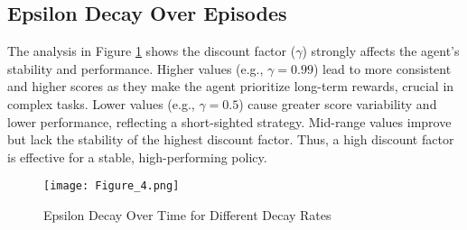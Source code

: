 \documentclass[conference]{IEEEtran}
\begin{document}
\subsection{Epsilon Decay Over Episodes}
The analysis in Figure \ref{fig:epsilon_decay_over_time} shows the discount factor ($\gamma$) strongly affects the agent's stability and performance. Higher values (e.g., $\gamma = 0.99$) lead to more consistent and higher scores as they make the agent prioritize long-term rewards, crucial in complex tasks. Lower values (e.g., $\gamma = 0.5$) cause greater score variability and lower performance, reflecting a short-sighted strategy. Mid-range values improve but lack the stability of the highest discount factor. Thus, a high discount factor is effective for a stable, high-performing policy.

\begin{figure}[!ht]
    \centering
    \texttt{[image: Figure\_4.png]}
    \caption{Epsilon Decay Over Time for Different Decay Rates}
    \label{fig:epsilon_decay_over_time}
\end{figure}
\end{document}
